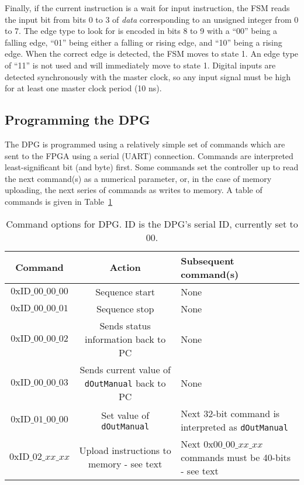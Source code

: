 \documentclass[]{article}
\begin{document}
Finally, if the current instruction is a wait for input instruction, the FSM reads the input bit from bits 0 to 3 of \emph{data} corresponding to an unsigned integer from 0 to 7.  The edge type to look for is encoded in bits 8 to 9 with a ``00'' being a falling edge, ``01'' being either a falling or rising edge, and ``10'' being a rising edge.  When the correct edge is detected, the FSM moves to state 1.  An edge type of ``11'' is not used and will immediately move to state 1.  Digital inputs are detected synchronously with the master clock, so any input signal must be high for at least one master clock period (10 ns).  

\subsection{Programming the DPG}
\label{sec:programming-dpg}
The DPG is programmed using a relatively simple set of commands which are sent to the FPGA using a serial (UART) connection.  Commands are interpreted least-significant bit (and byte) first.  Some commands set the controller up to read the next command(s) as a numerical parameter, or, in the case of memory uploading, the next series of commands as writes to memory.  A table of commands is given in Table~\ref{tb:commands}
\begin{table}[htbp]
	\centering
	\begin{tabular}{c|c|p{5cm}}
		Command							&	Action													&	Subsequent command(s)\\\hline
		$0\mathrm{xID}\_00\_00\_00$		&	Sequence start											&	None\\\hline
		$0\mathrm{xID}\_00\_00\_01$		&	Sequence stop											&	None\\\hline
		$0\mathrm{xID}\_00\_00\_02$		&	Sends status information back to PC						&	None\\\hline
		$0\mathrm{xID}\_00\_00\_03$		&	Sends current value of \verb|dOutManual| back to PC		&	None\\\hline
		$0\mathrm{xID}\_01\_00\_00$		&	Set value of \verb|dOutManual|							&	Next 32-bit command is interpreted as \verb|dOutManual|\\\hline
		$0\mathrm{xID}\_02\_xx\_xx$		&	Upload instructions to memory - see text				&	Next $0\mathrm{x}00\_00\_xx\_xx$ commands must be 40-bits - see text\\\hline
	\end{tabular}
	\caption{Command options for DPG.  ID is the DPG's serial ID, currently set to $00$.}
	\label{tb:commands}
\end{table}
\end{document}
